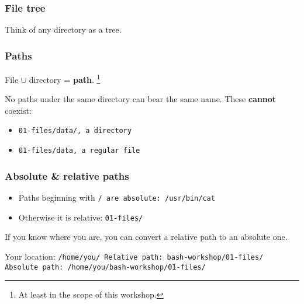 \begin{frame}
\frametitle{File tree}
Think of any directory as a tree.

\begin{figure}[h]
    \centering
\end{figure}
\end{frame}

\begin{frame}
\frametitle{Paths}
File $\cup$ directory = \textbf{path}.
\footnote{At least in the scope of this workshop.}
\newline \newline

No paths under the same directory can bear the same name.
These \textbf{cannot} coexist:
\begin{itemize}
    \item \tt{01-files/data/}, a directory
    \item \tt{01-files/data}, a regular file
\end{itemize}
\end{frame}

\begin{frame}
\frametitle{Absolute \& relative paths}
\begin{itemize}
    \item Paths beginning with \tt{/} are absolute: \tt{/usr/bin/cat}
    \item Otherwise it is relative: \tt{01-files/}
\end{itemize}

If you know where you are, you can convert a relative path to an absolute one.
\begin{example}
    Your location: \tt{/home/you/} \newline
    Relative path: \tt{bash-workshop/01-files/} \newline
    Absolute path: \tt{/home/you/bash-workshop/01-files/}
\end{example}
\end{frame}

